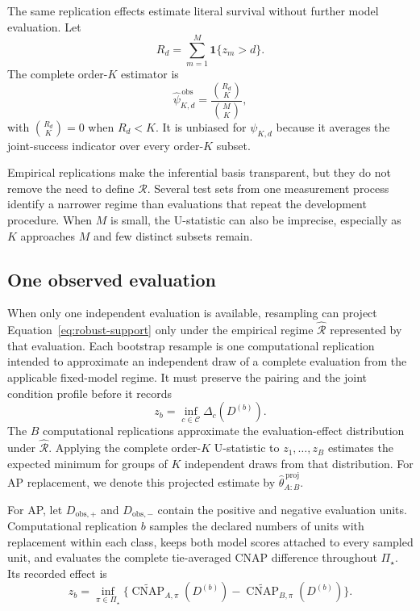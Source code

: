 \documentclass[11pt]{article}
\newcommand{\CNAP}{\operatorname{CNAP}}
\newcommand{\Regime}{\mathcal{R}}
\newcommand{\CSet}{\mathcal{C}}
\newcommand{\PSet}{\Pi_\star}
\newcommand{\CNAPta}{\widetilde{\CNAP}}
\theoremstyle{remark}
\begin{document}
The same replication effects estimate literal survival without further model evaluation. Let
\[
R_d=\sum_{m=1}^M\mathbf 1\{z_m>d\}.
\]
The complete order-$K$ estimator is
\begin{equation}
\widehat\psi_{K,d}^{\,\mathrm{obs}}
=
\frac{\binom{R_d}{K}}{\binom MK},
\label{eq:literal-survival-estimator}
\end{equation}
with $\binom{R_d}{K}=0$ when $R_d<K$. It is unbiased for $\psi_{K,d}$ because it averages the joint-success indicator over every order-$K$ subset.

Empirical replications make the inferential basis transparent, but they do not remove the need to define $\Regime$. Several test sets from one measurement process identify a narrower regime than evaluations that repeat the development procedure. When $M$ is small, the U-statistic can also be imprecise, especially as $K$ approaches $M$ and few distinct subsets remain.

\subsection{One observed evaluation}

When only one independent evaluation is available, resampling can project Equation~\eqref{eq:robust-support} only under the empirical regime $\widehat{\Regime}$ represented by that evaluation. Each bootstrap resample is one computational replication intended to approximate an independent draw of a complete evaluation from the applicable fixed-model regime. It must preserve the pairing and the joint condition profile before it records
\[
z_b
=
\inf_{c\in\CSet}\Delta_c(D^{(b)}).
\]
The $B$ computational replications approximate the evaluation-effect distribution under $\widehat{\Regime}$. Applying the complete order-$K$ U-statistic to $z_1,\ldots,z_B$ estimates the expected minimum for groups of $K$ independent draws from that distribution. For AP replacement, we denote this projected estimate by $\widehat\theta_{A:B}^{\,\mathrm{proj}}$.

For AP, let $D_{\mathrm{obs},+}$ and $D_{\mathrm{obs},-}$ contain the positive and negative evaluation units. Computational replication $b$ samples the declared numbers of units with replacement within each class, keeps both model scores attached to every sampled unit, and evaluates the complete tie-averaged CNAP difference throughout $\PSet$. Its recorded effect is
\[
z_b
=
\inf_{\pi\in\PSet}
\{\CNAPta_{A,\pi}(D^{(b)})-\CNAPta_{B,\pi}(D^{(b)})\}.
\]
\end{document}
